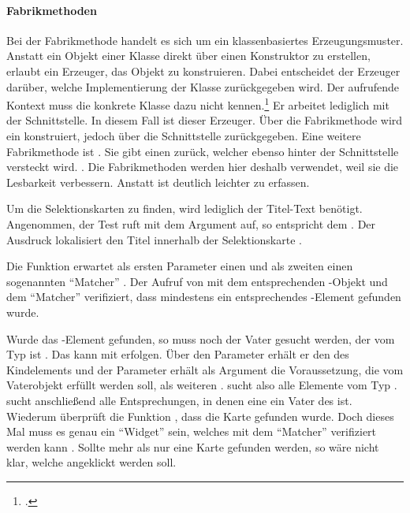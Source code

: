 \paragraph{Fabrikmethoden}
Bei der Fabrikmethode handelt es sich um ein klassenbasiertes Erzeugungsmuster.
Anstatt ein Objekt einer Klasse direkt über einen Konstruktor zu erstellen,
erlaubt ein Erzeuger, das Objekt zu konstruieren.
Dabei entscheidet der Erzeuger darüber,
welche Implementierung der Klasse zurückgegeben wird.
Der aufrufende Kontext muss die konkrete Klasse dazu nicht kennen.\footcite[Vgl.][107-116]{gamma2009entwurfsmuster} Er arbeitet lediglich mit der Schnittstelle.
In diesem Fall ist  dieser Erzeuger.
Über die Fabrikmethode  wird ein  konstruiert, jedoch über die Schnittstelle  zurückgegeben.
Eine weitere Fabrikmethode ist .
Sie gibt einen  zurück,
welcher ebenso hinter der Schnittstelle  versteckt wird. .
Die Fabrikmethoden werden hier deshalb verwendet, weil sie die Lesbarkeit verbessern.
Anstatt  ist  deutlich leichter zu erfassen.



Um die Selektionskarten zu finden, wird lediglich der Titel-Text benötigt.
Angenommen, der Test ruft  mit dem Argument  auf, so entspricht  dem  . Der Ausdruck  lokalisiert den Titel innerhalb der Selektionskarte .

Die Funktion  erwartet als ersten Parameter einen  und als zweiten einen sogenannten \enquote{Matcher} .
Der Aufruf von  mit dem entsprechenden -Objekt und dem \enquote{Matcher}  verifiziert, dass mindestens ein entsprechendes -Element gefunden wurde.

Wurde das -Element gefunden, so muss noch der Vater gesucht werden, der vom Typ  ist .
Das kann mit  erfolgen.
Über den Parameter  erhält er den  des Kindelements und der Parameter  erhält als Argument die Voraussetzung, die vom Vaterobjekt erfüllt werden soll,
als weiteren .
 sucht also alle Elemente vom Typ .
 sucht anschließend alle Entsprechungen, in denen eine  ein Vater des  ist.
Wiederum überprüft die Funktion ,
dass die Karte gefunden wurde.
Doch dieses Mal muss es genau ein \enquote{Widget} sein, welches mit dem \enquote{Matcher}  verifiziert werden kann .
Sollte mehr als nur eine Karte gefunden werden, so wäre nicht klar, welche angeklickt werden soll.

